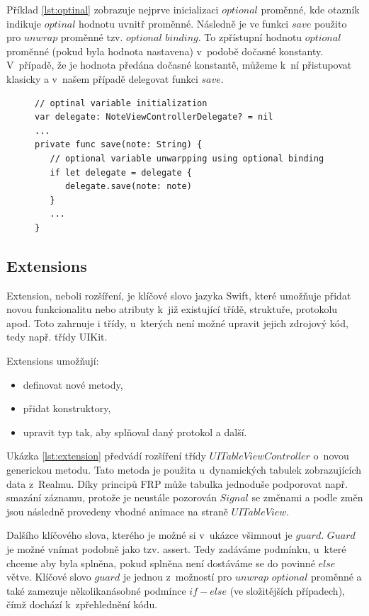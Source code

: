 \documentclass[thesis=M,czech]{FITthesis}[2012/06/26]
\begin{document}
Příklad \ref{lst:optinal} zobrazuje nejprve inicializaci $optional$ proměnné, kde otazník indikuje $optinal$ hodnotu uvnitř proměnné. Následně je ve funkci $save$ použito pro $unwrap$ proměnné tzv. $optional$ $binding$. To zpřístupní hodnotu $optional$ proměnné (pokud byla hodnota nastavena) v~podobě dočasné konstanty. V~případě, že je hodnota předána dočasné konstantě, můžeme k~ní přistupovat klasicky a v~našem případě delegovat funkci $save$.

\begin{figure}
\begin{minipage}{\linewidth}
\begin{lstlisting}[caption={Příklad práce s~Optinal},label={lst:optinal}]
// optinal variable initialization
var delegate: NoteViewControllerDelegate? = nil
...
private func save(note: String) {
   // optional variable unwarpping using optional binding
   if let delegate = delegate {
      delegate.save(note: note)
   }
   ...
}

\end{lstlisting}
\end{minipage}
\end{figure}


\subsection{Extensions}
Extension, neboli rozšíření, je klíčové slovo jazyka Swift, které umožňuje přidat novou funkcionalitu nebo atributy k~již existující třídě, struktuře, protokolu apod. Toto zahrnuje i třídy, u~kterých není možné upravit jejich zdrojový kód, tedy např. třídy UIKit.

Extensions umožňují: 
\begin{itemize}
	\item definovat nové metody,
	\item přidat konstruktory, 
	\item upravit typ tak, aby splňoval daný protokol a další. \cite{devExtensions}
\end{itemize}

Ukázka \ref{lst:extension} předvádí rozšíření třídy $UITableViewController$ o~novou generickou metodu. Tato metoda je použita u~dynamických tabulek zobrazujících data z~Realmu. Díky principů FRP může tabulka jednoduše podporovat např. smazání záznamu, protože je neustále pozorován $Signal$ se změnami a podle změn jsou následně provedeny vhodné animace na straně $UITableView$.

Dalšího klíčového slova, kterého je možné si v~ukázce všimnout je $guard$. $Guard$ je možné vnímat podobně jako tzv. assert. Tedy zadáváme podmínku, u~které chceme aby byla splněna, pokud splněna není dostáváme se do povinné $else$ větve. Klíčové slovo $guard$ je jednou z~možností pro $unwrap$ $optional$ proměnné a také zamezuje několikanásobné podmínce $if-else$ (ve složitějších případech), čímž dochází k~zpřehlednění kódu. \cite{devGuard}
\end{document}
